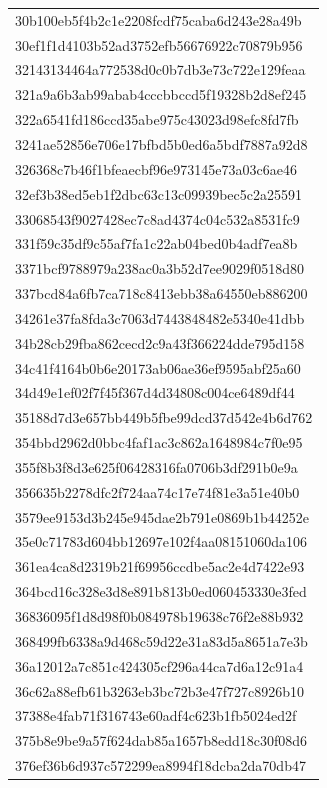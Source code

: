 \begin{tabular}{l}
30b100eb5f4b2c1e2208fcdf75caba6d243e28a49b \\
30ef1f1d4103b52ad3752efb56676922c70879b956 \\
32143134464a772538d0c0b7db3e73c722e129feaa \\
321a9a6b3ab99abab4cccbbccd5f19328b2d8ef245 \\
322a6541fd186ccd35abe975c43023d98efc8fd7fb \\
3241ae52856e706e17bfbd5b0ed6a5bdf7887a92d8 \\
326368c7b46f1bfeaecbf96e973145e73a03c6ae46 \\
32ef3b38ed5eb1f2dbc63c13c09939bec5c2a25591 \\
33068543f9027428ec7c8ad4374c04c532a8531fc9 \\
331f59c35df9c55af7fa1c22ab04bed0b4adf7ea8b \\
3371bcf9788979a238ac0a3b52d7ee9029f0518d80 \\
337bcd84a6fb7ca718c8413ebb38a64550eb886200 \\
34261e37fa8fda3c7063d7443848482e5340e41dbb \\
34b28cb29fba862cecd2c9a43f366224dde795d158 \\
34c41f4164b0b6e20173ab06ae36ef9595abf25a60 \\
34d49e1ef02f7f45f367d4d34808c004ce6489df44 \\
35188d7d3e657bb449b5fbe99dcd37d542e4b6d762 \\
354bbd2962d0bbc4faf1ac3c862a1648984c7f0e95 \\
355f8b3f8d3e625f06428316fa0706b3df291b0e9a \\
356635b2278dfc2f724aa74c17e74f81e3a51e40b0 \\
3579ee9153d3b245e945dae2b791e0869b1b44252e \\
35e0c71783d604bb12697e102f4aa08151060da106 \\
361ea4ca8d2319b21f69956ccdbe5ac2e4d7422e93 \\
364bcd16c328e3d8e891b813b0ed060453330e3fed \\
36836095f1d8d98f0b084978b19638c76f2e88b932 \\
368499fb6338a9d468c59d22e31a83d5a8651a7e3b \\
36a12012a7c851c424305cf296a44ca7d6a12c91a4 \\
36c62a88efb61b3263eb3bc72b3e47f727c8926b10 \\
37388e4fab71f316743e60adf4c623b1fb5024ed2f \\
375b8e9be9a57f624dab85a1657b8edd18c30f08d6 \\
376ef36b6d937c572299ea8994f18dcba2da70db47 \\

\end{tabular}
